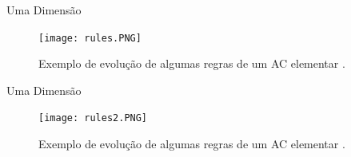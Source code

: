 \documentclass[compress, hide notes]{beamer}
\begin{document}

\begin{frame}{Uma Dimensão}
	
	\begin{figure}[h]
								
		\center
													
		\texttt{[image: rules.PNG]}
		\caption{Exemplo de evolução de algumas regras de um AC elementar \cite{wolfram}.}
									
	\end{figure}
	
\end{frame}

\begin{frame}{Uma Dimensão}
	
	\begin{figure}[h]
								
		\center
													
		\texttt{[image: rules2.PNG]}
		\caption{Exemplo de evolução de algumas regras de um AC elementar \cite{wolfram}.}
									
	\end{figure}
	
\end{frame}
\end{document}
